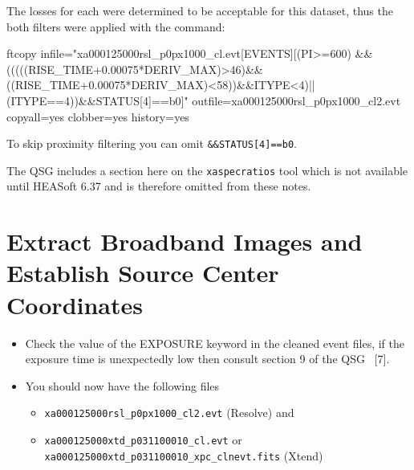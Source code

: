 \documentclass[
  letterpaper,
  DIV=11,
  numbers=noendperiod]{scrreprt}
\newenvironment{Shaded}{\begin{snugshade}}{\end{snugshade}}
\newcommand{\ExtensionTok}[1]{\textcolor[rgb]{0.00,0.23,0.31}{#1}}
\newcommand{\NormalTok}[1]{\textcolor[rgb]{0.00,0.23,0.31}{#1}}
\newcommand{\StringTok}[1]{\textcolor[rgb]{0.13,0.47,0.30}{#1}}
\providecommand{\tightlist}{%
  \setlength{\itemsep}{0pt}\setlength{\parskip}{0pt}}
\begin{document}
The losses for each were determined to be acceptable for this dataset,
thus the both filters were applied with the command:

\begin{Shaded}
\begin{Highlighting}[]
\ExtensionTok{ftcopy}\NormalTok{ infile=}\StringTok{"xa000125000rsl\_p0px1000\_cl.evt[EVENTS][(PI\textgreater{}=600) \&\& (((((RISE\_TIME+0.00075*DERIV\_MAX)\textgreater{}46)\&\&((RISE\_TIME+0.00075*DERIV\_MAX)\textless{}58))\&\&ITYPE\textless{}4)||(ITYPE==4))\&\&STATUS[4]==b0]"}\NormalTok{ outfile=xa000125000rsl\_p0px1000\_cl2.evt copyall=yes clobber=yes history=yes}
\end{Highlighting}
\end{Shaded}

To skip proximity filtering you can omit \texttt{\&\&STATUS{[}4{]}==b0}.

\begin{tcolorbox}[enhanced jigsaw, arc=.35mm, bottomrule=.15mm, bottomtitle=1mm, breakable, colback=white, colbacktitle=quarto-callout-note-color!10!white, colframe=quarto-callout-note-color-frame, coltitle=black, left=2mm, leftrule=.75mm, opacityback=0, opacitybacktitle=0.6, rightrule=.15mm, title=\textcolor{quarto-callout-note-color}{\faInfo}\hspace{0.5em}{Note}, titlerule=0mm, toprule=.15mm, toptitle=1mm]

The QSG includes a section here on the \texttt{xaspecratios} tool which
is not available until HEASoft 6.37 and is therefore omitted from these
notes.

\end{tcolorbox}

\section{Extract Broadband Images and Establish Source Center
Coordinates}\label{extract-broadband-images-and-establish-source-center-coordinates}

\begin{itemize}
\tightlist
\item
  Check the value of the EXPOSURE keyword in the cleaned event files, if
  the exposure time is unexpectedly low then consult section 9 of the
  QSG ~{[}7{]}.
\item
  You should now have the following files

  \begin{itemize}
  \tightlist
  \item
    \texttt{xa000125000rsl\_p0px1000\_cl2.evt} (Resolve) and
  \item
    \texttt{xa000125000xtd\_p031100010\_cl.evt} or
    \texttt{xa000125000xtd\_p031100010\_xpc\_clnevt.fits} (Xtend)
  \end{itemize}
\end{itemize}
\end{document}
